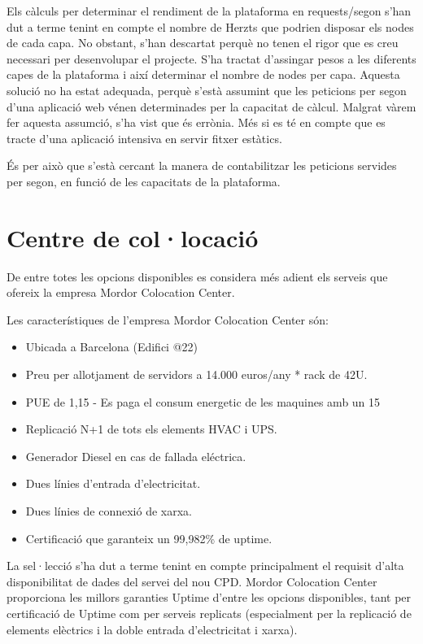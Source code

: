 \documentclass[a4paper, 11pt]{article}
\begin{document}
Els càlculs per determinar el rendiment de la plataforma en requests/segon s'han dut a terme tenint en compte el nombre de Herzts que podrien disposar els nodes de cada capa. No obstant, s'han descartat perquè no tenen el rigor que es creu necessari per desenvolupar el projecte. 
S'ha tractat d'assingar pesos a les diferents capes de la plataforma i així determinar el nombre de nodes per capa. Aquesta solució no ha estat adequada, perquè s'està assumint que les peticions per segon d'una aplicació web vénen determinades per la capacitat de càlcul. Malgrat vàrem fer aquesta assumció, s'ha vist que és errònia. Més si es té en compte que es tracte d'una aplicació intensiva en servir fitxer estàtics.

És per això que s'està cercant la manera de contabilitzar les peticions servides per segon, en funció de les capacitats de la plataforma.

\section{Centre de col·locació}

De entre totes les opcions disponibles es considera més adient els serveis que ofereix la empresa Mordor Colocation Center. 

Les característiques de l’empresa Mordor Colocation Center són:

\begin{itemize}
\item Ubicada a Barcelona (Edifici @22)
\item Preu per allotjament de servidors a 14.000 euros/any * rack de 42U.
\item PUE de 1,15 - Es paga el consum energetic de les maquines amb un 15%
\item Replicació N+1 de tots els elements HVAC i UPS.
\item Generador Diesel en cas de fallada eléctrica.
\item Dues línies d’entrada d’electricitat.
\item Dues línies de connexió de xarxa.
\item Certificació que garanteix un 99,982\% de uptime.
\end{itemize}

La sel·lecció s’ha dut a terme tenint en compte principalment el requisit d’alta disponibilitat de dades del servei del nou CPD. Mordor Colocation Center proporciona les millors garanties Uptime d’entre les opcions disponibles, tant per certificació de Uptime com per serveis replicats (especialment per la replicació de elements elèctrics i la doble entrada d’electricitat i xarxa).
\end{document}
